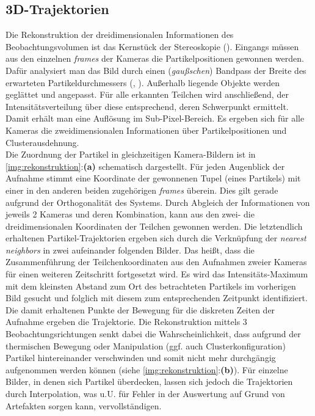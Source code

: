 \documentclass[numbers=noenddot,a4paper,notitlepage,twoside,BCOR15mm]{scrbook}
\newcommand{\tilt}[1]{\textit{#1}}
\newcommand{\fett}[1]{\textbf{#1}}
\begin{document}
				\subsection{3D-Trajektorien}

					Die Rekonstruktion der dreidimensionalen Informationen des Beobachtungsvolumen ist das Kernst\"uck der Stereoskopie (\cite{Bonitz10}). Eingangs m\"ussen aus den einzelnen \tilt{frames} der Kameras die Partikelpositionen gewonnen werden. Daf\"ur analysiert man das Bild durch einen (\tilt{gau{\ss}schen}) Bandpass der Breite des erwarteten Partikeldurchmessers (\cite{Crocker96a}, \cite{Ivanov07}). Au{\ss}erhalb liegende Objekte werden gegl\"attet und angepasst. F\"ur alle erkannten Teilchen wird anschlie{\ss}end, der Intensit\"atsverteilung \"uber diese entsprechend, deren Schwerpunkt ermittelt. Damit erhält man eine Auflösung im Sub-Pixel-Bereich. Es ergeben sich f\"ur alle Kameras die zweidimensionalen Informationen \"uber Partikelpositionen und Clusterausdehnung.\\
					Die Zuordnung der Partikel in gleichzeitigen Kamera-Bildern ist in \autoref{img:rekonstruktion}:\fett{(a)} schematisch dargestellt. F\"ur jeden Augenblick der Aufnahme stimmt eine Koordinate der gewonnenen Tupel (eines Partikels) mit einer in den anderen beiden zugeh\"origen \tilt{frames} \"uberein. Dies gilt gerade aufgrund der Orthogonalität des Systems. Durch Abgleich der Informationen von jeweils 2 Kameras und deren Kombination, kann aus den zwei- die dreidimensionalen Koordinaten der Teilchen gewonnen werden. Die letztendlich erhaltenen Partikel-Trajektorien ergeben sich durch die Verknüpfung der \tilt{nearest neighbors} in zwei aufeinander folgenden Bilder. Das heißt, dass die Zusammenführung der Teilchenkoordinaten aus den Aufnahmen zweier Kameras für einen weiteren Zeitschritt fortgesetzt wird. Es wird das Intensitäts-Maximum mit dem kleinsten Abstand zum Ort des betrachteten Partikels im vorherigen Bild gesucht und folglich mit diesem zum entsprechenden Zeitpunkt identifiziert. Die damit erhaltenen Punkte der Bewegung für die diskreten Zeiten der Aufnahme ergeben die Trajektorie.
					Die Rekonstruktion mittels 3 Beobachtungsrichtungen senkt dabei die Wahrscheinlichkeit, dass aufgrund der thermischen Bewegung oder Manipulation (ggf. auch Clusterkonfiguration) Partikel hintereinander verschwinden und somit nicht mehr durchg\"angig aufgenommen werden k\"onnen (siehe \autoref{img:rekonstruktion}:\fett{(b)}). F\"ur einzelne Bilder, in denen sich Partikel \"uberdecken, lassen sich jedoch die Trajektorien durch Interpolation, was u.U. f\"ur Fehler in der Auswertung auf Grund von Artefakten sorgen kann, vervollst\"andigen.
\end{document}
